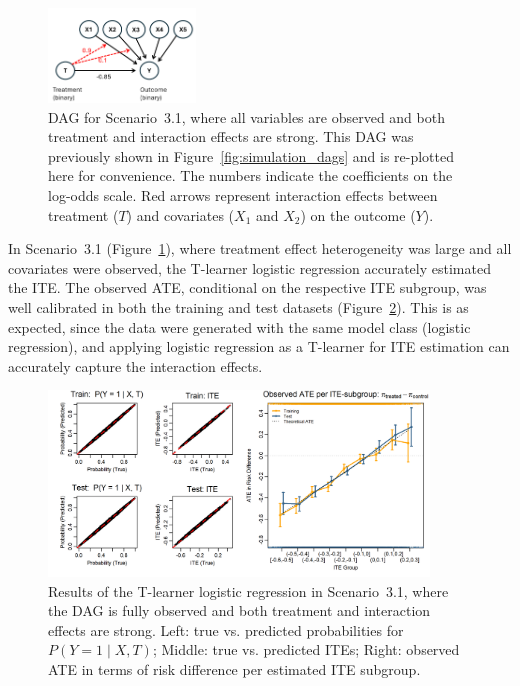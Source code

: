 \begin{figure}[htbp]
\centering
\includegraphics[width=0.35\textwidth]{img/results_ITE_simulation/simulation_observed.png}
\caption{DAG for Scenario~3.1, where all variables are observed and both treatment and interaction effects are strong. This DAG was previously shown in Figure~\ref{fig:simulation_dags} and is re-plotted here for convenience. The numbers indicate the coefficients on the log-odds scale. Red arrows represent interaction effects between treatment ($T$) and covariates ($X_1$ and $X_2$) on the outcome ($Y$).}
\label{fig:fully_observed_dag}
\end{figure}


In Scenario~3.1 (Figure~\ref{fig:fully_observed_dag}),  where treatment effect heterogeneity was large and all covariates were observed, the T-learner logistic regression accurately estimated the ITE. The observed ATE, conditional on the respective ITE subgroup, was well calibrated in both the training and test datasets (Figure~\ref{fig:fully_observed_glm_tlearner}). This is as expected, since the data were generated with the same model class (logistic regression), and applying logistic regression as a T-learner for ITE estimation can accurately capture the interaction effects.

\begin{figure}[htbp]
\centering
\includegraphics[width=0.9\textwidth]{img/results_ITE_simulation/fully_observed_glm_tlearner.png}
\caption{Results of the T-learner logistic regression in Scenario~3.1, where the DAG is fully observed and both treatment and interaction effects are strong. Left: true vs. predicted probabilities for $P(Y = 1 \mid X, T)$; Middle: true vs. predicted ITEs; Right: observed ATE in terms of risk difference per estimated ITE subgroup.}
\label{fig:fully_observed_glm_tlearner}
\end{figure}



